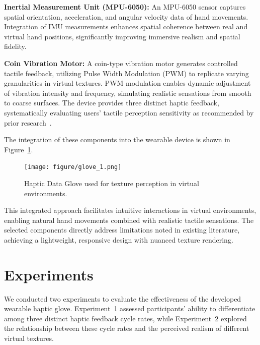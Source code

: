 \documentclass[graybox]{svmult}
\begin{document}
\textbf{Inertial Measurement Unit (MPU-6050):}  
An MPU-6050 sensor captures spatial orientation, acceleration, and angular velocity data of hand movements. Integration of IMU measurements enhances spatial coherence between real and virtual hand positions, significantly improving immersive realism and spatial fidelity.

\textbf{Coin Vibration Motor:}  
A coin-type vibration motor generates controlled tactile feedback, utilizing Pulse Width Modulation (PWM) to replicate varying granularities in virtual textures. PWM modulation enables dynamic adjustment of vibration intensity and frequency, simulating realistic sensations from smooth to coarse surfaces. The device provides three distinct haptic feedback, systematically evaluating users' tactile perception sensitivity as recommended by prior research~\cite{strohmeier2017generating, bensmaia2003vibrations}.

The integration of these components into the wearable device is shown in Figure~\ref{fig:glove_1}.

\begin{figure}\centering
	\texttt{[image: figure/glove\_1.png]}%
	\caption{Haptic Data Glove used for texture perception in virtual environments.}\label{fig:glove_1}
\end{figure}

This integrated approach facilitates intuitive interactions in virtual environments, enabling natural hand movements combined with realistic tactile sensations. The selected components directly address limitations noted in existing literature, achieving a lightweight, responsive design with nuanced texture rendering.

\section{Experiments}
We conducted two experiments to evaluate the effectiveness of the developed wearable haptic glove. Experiment~1 assessed participants' ability to differentiate among three distinct haptic feedback cycle rates, while Experiment~2 explored the relationship between these cycle rates and the perceived realism of different virtual textures.
\end{document}
